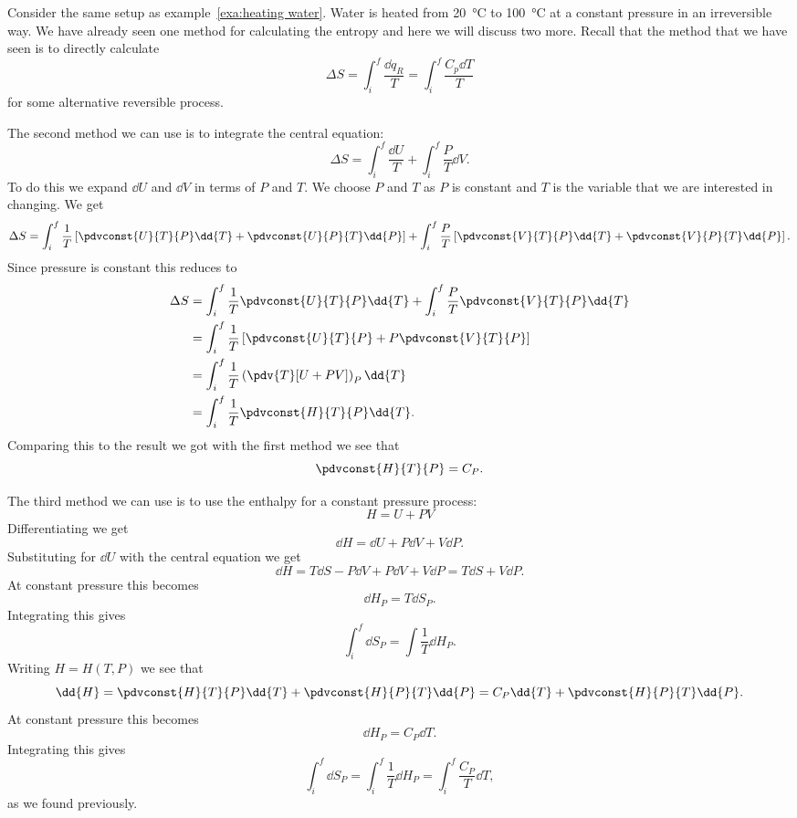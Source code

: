     \begin{example}
        Consider the same setup as example~\ref{exa:heating water}.
        Water is heated from \SI{20}{\degreeCelsius} to \SI{100}{\degreeCelsius} at a constant pressure in an irreversible way.
        We have already seen one method for calculating the entropy and here we will discuss two more.
        Recall that the method that we have seen is to directly calculate
        \[\Delta S = \int_i^f \frac{\dd{q_R}}{T} = \int_i^f \frac{C_p\dd{T}}{T}\]
        for some alternative reversible process.
        
        The second method we can use is to integrate the central equation:
        \[\Delta S = \int_i^f \frac{\dd{U}}{T} + \int_i^f \frac{P}{T}\dd{V}.\]
        To do this we expand \(\dd{U}\) and \(\dd{V}\) in terms of \(P\) and \(T\).
        We choose \(P\) and \(T\) as \(P\) is constant and \(T\) is the variable that we are interested in changing.
        We get
        \[\Delta S = \int_i^f \frac{1}{T}\left[\pdvconst{U}{T}{P}\dd{T} + \pdvconst{U}{P}{T}\dd{P}\right] + \int_i^f \frac{P}{T}\left[\pdvconst{V}{T}{P}\dd{T} + \pdvconst{V}{P}{T}\dd{P}\right].\]
        Since pressure is constant this reduces to
        \begin{align*}
            \Delta S &= \int_i^f \frac{1}{T} \pdvconst{U}{T}{P}\dd{T} + \int_i^f \frac{P}{T} \pdvconst{V}{T}{P}\dd{T}\\
                &= \int_i^f \frac{1}{T} \left[\pdvconst{U}{T}{P} + P\pdvconst{V}{T}{P}\right]\\
                &= \int_i^f \frac{1}{T} \left(\pdv{T}[U + PV]\right)_{P}\dd{T}\\
                &= \int_i^f \frac{1}{T} \pdvconst{H}{T}{P}\dd{T}.
        \end{align*}
        Comparing this to the result we got with the first method we see that
        \[\pdvconst{H}{T}{P} = C_P.\]
        
        The third method we can use is to use the enthalpy for a constant pressure process:
        \[H = U + PV\]
        Differentiating we get
        \[\dd{H} = \dd{U} + P\dd{V} + V\dd{P}.\]
        Substituting for \(\dd{U}\) with the central equation we get
        \[\dd{H} = T\dd{S} - P\dd{V} + P\dd{V} + V\dd{P} = T\dd{S} + V\dd{P}.\]
        At constant pressure this becomes
        \[\dd{H_P} = T\dd{S_P}.\]
        Integrating this gives
        \[\int_i^f\dd{S_P} = \int\frac{1}{T}\dd{H_P}.\]
        Writing \(H = H(T, P)\) we see that
        \[\dd{H} = \pdvconst{H}{T}{P}\dd{T} + \pdvconst{H}{P}{T}\dd{P} = C_P\dd{T} + \pdvconst{H}{P}{T}\dd{P}.\]
        At constant pressure this becomes
        \[\dd{H_P} = C_P\dd{T}.\]
        Integrating this gives
        \[\int_i^f\dd{S_P} = \int_i^f\frac{1}{T}\dd{H_P} = \int_i^f\frac{C_P}{T}\dd{T},\]
        as we found previously.
    \end{example}
